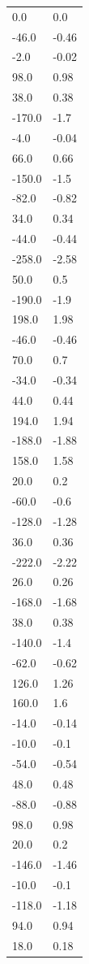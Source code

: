 \begin{longtable}{ll}
0.0 & 0.0 \\
-46.0 & -0.46 \\
-2.0 & -0.02 \\
98.0 & 0.98 \\
38.0 & 0.38 \\
-170.0 & -1.7 \\
-4.0 & -0.04 \\
66.0 & 0.66 \\
-150.0 & -1.5 \\
-82.0 & -0.82 \\
34.0 & 0.34 \\
-44.0 & -0.44 \\
-258.0 & -2.58 \\
50.0 & 0.5 \\
-190.0 & -1.9 \\
198.0 & 1.98 \\
-46.0 & -0.46 \\
70.0 & 0.7 \\
-34.0 & -0.34 \\
44.0 & 0.44 \\
194.0 & 1.94 \\
-188.0 & -1.88 \\
158.0 & 1.58 \\
20.0 & 0.2 \\
-60.0 & -0.6 \\
-128.0 & -1.28 \\
36.0 & 0.36 \\
-222.0 & -2.22 \\
26.0 & 0.26 \\
-168.0 & -1.68 \\
38.0 & 0.38 \\
-140.0 & -1.4 \\
-62.0 & -0.62 \\
126.0 & 1.26 \\
160.0 & 1.6 \\
-14.0 & -0.14 \\
-10.0 & -0.1 \\
-54.0 & -0.54 \\
48.0 & 0.48 \\
-88.0 & -0.88 \\
98.0 & 0.98 \\
20.0 & 0.2 \\
-146.0 & -1.46 \\
-10.0 & -0.1 \\
-118.0 & -1.18 \\
94.0 & 0.94 \\
18.0 & 0.18 \\

\end{longtable}
